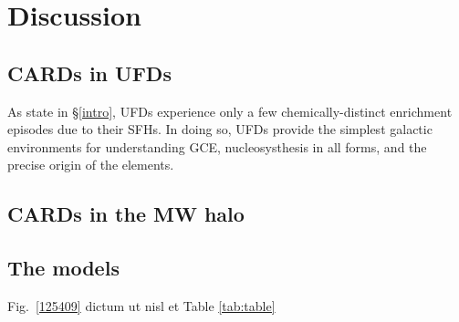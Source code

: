 \section{Discussion}
\label{diss}


\subsection{CARDs in UFDs}
\label{ufdcards}

As state in \S\ref{intro}, UFDs experience only a few chemically-distinct enrichment episodes due to their SFHs. In doing so, UFDs provide the simplest galactic environments for understanding GCE, nucleosysthesis in all forms, and the precise origin of the elements. 

\subsection{CARDs in the MW halo}
\label{ufdcards}

\subsection{The models}
\label{models}

Fig.~\ref{125409} dictum ut nisl et Table \ref{tab:table}
